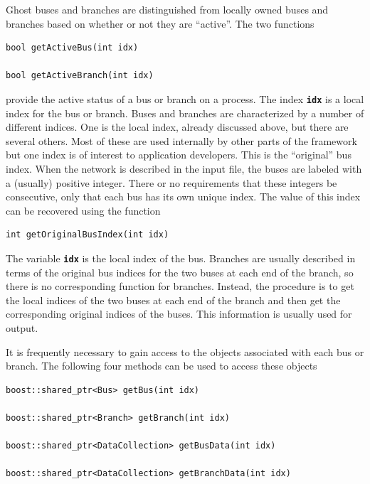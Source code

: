 Ghost buses and branches are distinguished from locally owned buses and branches based on whether or not they are ``active''. The two functions

{
\color{red}
\begin{Verbatim}[fontseries=b]
bool getActiveBus(int idx)

bool getActiveBranch(int idx)
\end{Verbatim}
}

provide the active status of a bus or branch on a process. The index \texttt{\textbf{idx}} is a local index for the bus or branch.
Buses and branches are characterized by a number of different indices. One is the local index, already discussed above, but there are several others. Most of these are used internally by other parts of the framework but one index is of interest to application developers. This is the ``original'' bus index. When the network is described in the input file, the buses are labeled with a (usually) positive integer. There or no requirements that these integers be consecutive, only that each bus has its own unique index. The value of this index can be recovered using the function

{
\color{red}
\begin{Verbatim}[fontseries=b]
int getOriginalBusIndex(int idx)
\end{Verbatim}
}

The variable \texttt{\textbf{idx}} is the local index of the bus. Branches are usually described in terms of the original bus indices for the two buses at each end of the branch, so there is no corresponding function for branches. Instead, the procedure is to get the local indices of the two buses at each end of the branch and then get the corresponding original indices of the buses. This information is usually used for output.

It is frequently necessary to gain access to the objects associated with each bus or branch. The following four methods can be used to access these objects

{
\color{red}
\begin{Verbatim}[fontseries=b]
boost::shared_ptr<Bus> getBus(int idx)

boost::shared_ptr<Branch> getBranch(int idx)

boost::shared_ptr<DataCollection> getBusData(int idx)

boost::shared_ptr<DataCollection> getBranchData(int idx)
\end{Verbatim}
}

